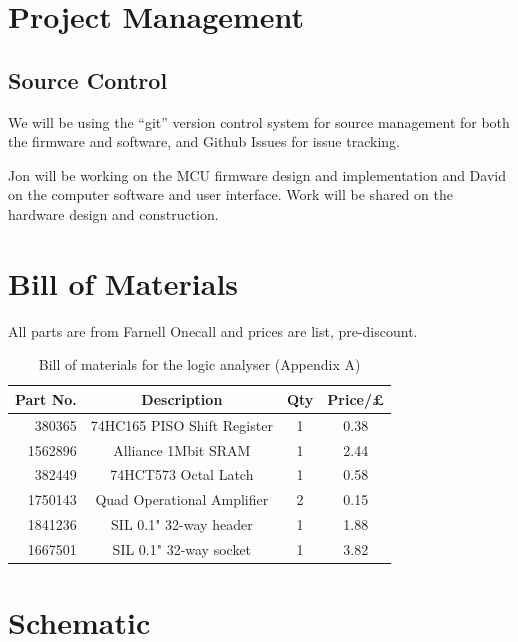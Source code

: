 \documentclass[11pt]{article}
\begin{document}
\section{Project Management}
\subsection{Source Control}
    We will be using the ``git'' version control system for source management for both the firmware and software, and Github Issues for issue tracking.

    Jon will be working on the MCU firmware design and implementation and David on the computer software and user interface. Work will be shared on the hardware design and construction.
	
\appendix
\appendixpage
\addappheadtotoc

\section{Bill of Materials}
    All parts are from Farnell Onecall and prices are list, pre-discount.

    \begin{table}
    \begin{center}
    \begin{tabular}{|r|c|c|c|}
        \hline \textbf{Part No.} & \textbf{Description} & \textbf{Qty} & \textbf{Price/£ }  \\
        \hline 380365 & 74HC165 PISO Shift Register & 1 & 0.38 \\
        \hline 1562896 & Alliance 1Mbit SRAM & 1 & 2.44 \\
         \hline 382449 & 74HCT573 Octal Latch & 1 & 0.58 \\
        \hline 1750143 & Quad Operational Amplifier & 2 & 0.15 \\
        \hline 1841236 & SIL 0.1" 32-way header & 1 & 1.88 \\
        \hline 1667501 & SIL 0.1" 32-way socket & 1 & 3.82 \\
        \hline
    \end{tabular}
    \end{center}
    \caption{Bill of materials for the logic analyser (Appendix A)}
    \label{fig:myt}
    \end{table}

\section{Schematic}
\label{app-schematic}
			
\end{document}
